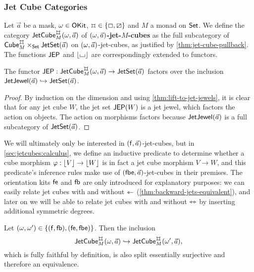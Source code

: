 \documentclass[a4paper]{memoir}
\begin{document}
\subsubsection{Jet Cube Categories}
\begin{definition} \label{def:jet-cube-cat}
	Let $\vec a$ be a mask, $\omega \in {\mathsf{OKit}}$, $\mycubex \in \accol{\affine, \cartes}$ and $M$ a monad on ${\mathsf{Set}}$.
	We define
	the category $\jetcube{\myorix}{\mycubex}{M}{\vec a}$ of \textbf{$(\omega, \vec a)$-jet-$M$-cubes}
	as the full subcategory of $\cubecat^\mycubex_M \times_\Set \jetset{\vec a}$ on $(\omega, \vec a)$-jet-cubes, as justified by \cref{thm:jet-cube-pullback}.
	The functions $\mathsf{JEP}$ and $\mathopen{}\left\lfloor {\llcorner\hspace{-.4ex}\lrcorner} \right\rfloor\mathclose{}$ are correspondingly extended to functors.
\end{definition}
\begin{corollary} \label{thm:jet-cubes-are-jewels}
	The functor $\JEP : \jetcube{\myorix}{\mycubex}{M}{\vec a} \to \jetset{\vec a}$ factors over the inclusion $\mathsf{JetJewel}(\vec a) \hookrightarrow \mathsf{JetSet}(\vec a)$.
\end{corollary}
\begin{proof}
	By induction on the dimension and using \cref{thm:lift-to-jet-jewels}, it is clear that for any jet cube $W$, the jet set $\mathsf{JEP}(W)$ is a jet jewel, which factors the action on objects. The action on morphisms factors because $\mathsf{JetJewel}(\vec a)$ is a full subcategory of $\mathsf{JetSet}(\vec a)$.
\end{proof}
We will ultimately only be interested in $({\mathsf{f}}, \vec a)$-jet-cubes, but in \cref{sec:jetcubes:calculus}, we define an inductive predicate to determine whether a cube morphism $\varphi : \mathopen{}\left\lfloor V \right\rfloor\mathclose{} \to \mathopen{}\left\lfloor W \right\rfloor\mathclose{}$ is in fact a jet cube morphism $V \to W$, and this predicate's inference rules make use of $({\mathsf{fbe}}, \vec a)$-jet-cubes in their premises.
The orientation kits ${\mathsf{fe}}$ and ${\mathsf{fb}}$ are only introduced for explanatory purposes: we can easily relate jet cubes with and without $\leftarrowtriangle$ (\cref{thm:backward-jets-equivalent}), and later on we will be able to relate jet cubes with and without $\leftrightarrowtriangle$ by inserting additional symmetric degrees.
\begin{proposition} \label{thm:backward-jets-equivalent}
	Let $(\omega, \omega') \in \mathopen{}\left\{ ({\mathsf{f}}, {\mathsf{fb}}), ({\mathsf{fe}}, {\mathsf{fbe}}) \right\}\mathclose{}$.
	Then the inclusion
	\[
		\jetcube{\myorix}{\mycubex}{M}{\vec a} \hookrightarrow \jetcube{\myorix'}{\mycubex}{M}{\vec a},
	\]
	which is fully faithful by definition, is also split essentially surjective and therefore an equivalence.
\end{proposition}
\end{document}
